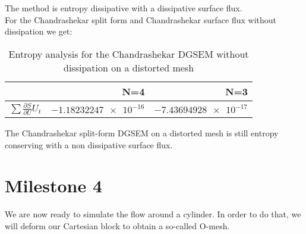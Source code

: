 \documentclass[11pt]{scrartcl}
\begin{document}
The method is entropy dissipative with a dissipative surface flux.\\
For the Chandrashekar split form and Chandrashekar surface flux without dissipation we get: \\
\begin{table}[H]
\centering
\begin{tabular}{|r|r|r|}
    \hline\hline
     & \textbf{N=4} & \textbf{N=3} \\\hline
    $\sum \frac{\partial S}{\partial U} U_t$ & $\num{-1.18232247e-16}$ & $\num{-7.43694928e-17}$ \\\hline\hline
\end{tabular}
\caption{Entropy analysis for the Chandrashekar DGSEM without dissipation on a distorted mesh}
\end{table}
The Chandrashekar split-form DGSEM  on a distorted mesh is still entropy conserving with a non dissipative surface flux. 


\newpage
\section{Milestone 4}
We are now ready to simulate the flow around a cylinder. In order to do that, we will deform our Cartesian block to obtain a so-called O-mesh. \\
\end{document}
